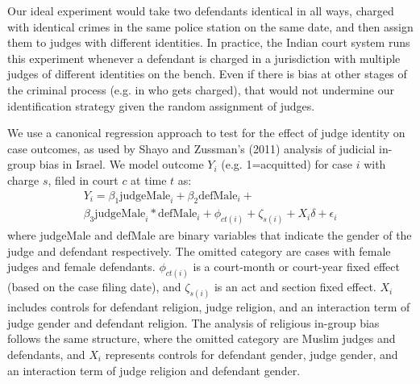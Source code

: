 \documentclass[12pt,english]{article}
\begin{document}
Our ideal experiment would take two defendants identical in all ways, charged with identical crimes in the same police station on the same date, and then assign them to judges with different identities. In practice, the Indian court system runs this experiment whenever a defendant is charged in a jurisdiction with multiple judges of different identities on the bench. Even if there is bias at other stages of the criminal process (e.g. in who gets charged), that would not undermine our identification strategy given the random assignment of judges.

We use a canonical regression approach to test for the effect of judge identity on case outcomes, as used by Shayo and Zussman's (2011) analysis of judicial in-group bias in Israel.  We model outcome $Y_{i}$ (e.g. 1=acquitted) for case $i$ with charge $s$, filed in court $c$ at time $t$ as:
\begin{equation}
  \label{eq:female}
  \begin{split}
    Y_{i} = \beta_{1} \text{judgeMale}_{i} + \beta_{2} \text{defMale}_{i} + \\
    \beta_{3} \text{judgeMale}_{i} * \text{defMale}_{i} + \phi_{ct(i)} + \zeta_{s(i)} + X_i \delta + \epsilon_{i}
  \end{split}
\end{equation}
where judgeMale and defMale are binary variables that indicate the gender of the judge and defendant respectively. The omitted category are cases with female judges and female defendants. $\phi_{ct(i)}$ is a court-month or court-year fixed effect (based on the case filing date), and $\zeta_{s(i)}$ is an act and section fixed effect. $X_i$ includes controls for defendant religion, judge religion, and an interaction term of judge gender and defendant religion. The analysis of religious in-group bias follows the same structure, where the omitted category are Muslim judges and defendants, and $X_i$ represents controls for defendant gender, judge gender, and an interaction term of judge religion and defendant gender.
\end{document}
